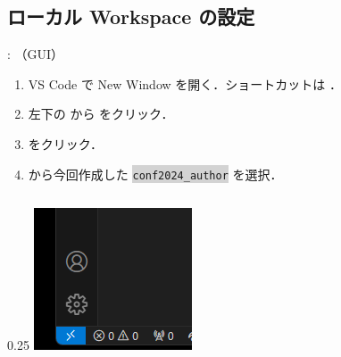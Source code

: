 \documentclass[aspectratio=169,dvipdfmx,cjk]{beamer}
\newcommand{\cmdline}[1]{
    \colorbox{lightgray}{\lstinline[style=command]{#1}}
}
\begin{document}
\subsection{ローカル Workspace の設定}
\begin{frame}{\insertsection \thesubsection: \insertsubsection （GUI）}
  \begin{enumerate}
    \item VS Code で New Window を開く．ショートカットは ．
    \item 左下の\beamerbutton{$><$} から  をクリック．
    \item {} をクリック．
    \item {} から今回作成した \cmdline{conf2024_author} を選択．
  \end{enumerate}
  \begin{columns}
    \begin{column}{0.25\textwidth}
        \includegraphics[width=1.0\linewidth]{fig/connect.png}
    \end{column}
    \begin{column}{0.3\textwidth}

\end{column}
\end{columns}
\end{frame}
\end{document}
